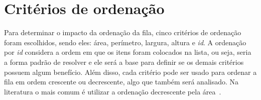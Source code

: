 \section{Critérios de ordenação}\label{sec:criterios-de-ordenacao}

Para determinar o impacto da ordenação da fila, cinco critérios de ordenação
foram escolhidos, sendo eles: área, perímetro, largura, altura e \textit{id}.
A ordenação por \textit{id} considera a ordem em que os itens foram colocados na lista, ou seja,
seria a forma padrão de resolver e ele será a base para definir se os demais critérios possuem
algum benefício.
Além disso, cada critério pode ser usado para ordenar a fila em ordem crescente ou decrescente,
algo que também será analisado.
Na literatura o mais comum é utilizar a ordenação decrescente pela área~\cite{chen2019efficient}.
